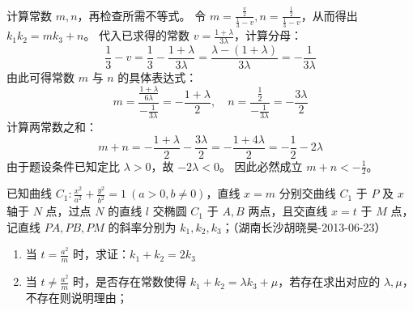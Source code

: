 \begin{solution}
计算常数 $m, n$，再检查所需不等式。
令 $m = \frac{\frac{v}{2}}{\frac{1}{3} - v}, n = \frac{\frac{1}{2}}{\frac{1}{3} - v}$，从而得出 $k_1 k_2 = m k_3 + n$。
代入已求得的常数 $v = \frac{1+\lambda}{3\lambda}$，计算分母：
$$ \frac{1}{3} - v = \frac{1}{3} - \frac{1+\lambda}{3\lambda} = \frac{\lambda - (1+\lambda)}{3\lambda} = -\frac{1}{3\lambda} $$
由此可得常数 $m$ 与 $n$ 的具体表达式：
$$ m = \frac{\frac{1+\lambda}{6\lambda}}{-\frac{1}{3\lambda}} = -\frac{1+\lambda}{2}, \quad n = \frac{\frac{1}{2}}{-\frac{1}{3\lambda}} = -\frac{3\lambda}{2} $$
计算两常数之和：
$$ m + n = -\frac{1+\lambda}{2} - \frac{3\lambda}{2} = -\frac{1 + 4\lambda}{2} = -\frac{1}{2} - 2\lambda $$
由于题设条件已知定比 $\lambda > 0$，故 $-2\lambda < 0$。
因此必然成立 $m + n < -\frac{1}{2}$。
\end{solution}

\begin{exercise}
已知曲线 \(C_1: \frac{x^2}{a^2} + \frac{y^2}{b^2} = 1\ (a > 0, b \neq 0)\)，直线 \(x = m\) 分别交曲线 \(C_1\) 于 \(P\) 及 \(x\) 轴于 \(N\) 点，过点 \(N\) 的直线 \(l\) 交椭圆 \(C_1\) 于 \(A, B\) 两点，且交直线 \(x = t\) 于 \(M\) 点，记直线 \(PA, PB, PM\) 的斜率分别为 \(k_1, k_2, k_3\)；（湖南长沙胡晓昊-2013-06-23）
\begin{enumerate}
    \item 当 \(t = \frac{a^2}{m}\) 时，求证：\(k_1 + k_2 = 2k_3\)
    \item 当 \(t \neq \frac{a^2}{m}\) 时，是否存在常数使得 \(k_1 + k_2 = \lambda k_3 + \mu\)，若存在求出对应的 \(\lambda, \mu\)，不存在则说明理由；
\end{enumerate}
\end{exercise}
